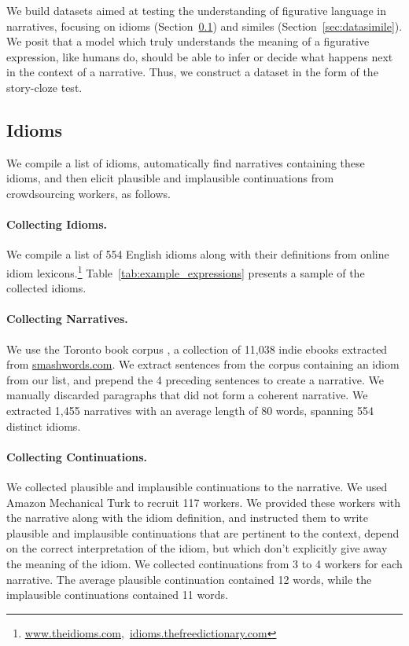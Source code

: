 

We build datasets aimed at testing the understanding of figurative language in narratives, focusing on idioms (Section~\ref{sec:dataidioms}) and similes (Section~\ref{sec:datasimile}). We posit that a model which truly understands the meaning of a figurative expression, like humans do, should be able to infer or decide what happens next in the context of a narrative. Thus, we construct a dataset in the form of the story-cloze test.

\subsection{Idioms}
\label{sec:dataidioms}

We compile a list of idioms, automatically find narratives containing these idioms, and then elicit plausible and implausible continuations from crowdsourcing workers, as follows.

\paragraph{Collecting Idioms.} We compile a list of 554 English idioms along with their definitions from online idiom lexicons.\footnote{\href{http://www.theidioms.com/}{www.theidioms.com},~\href{http://idioms.thefreedictionary.com/}{idioms.thefreedictionary.com}} Table~\ref{tab:example_expressions} presents a sample of the collected idioms.


\paragraph{Collecting Narratives.} We use the Toronto book corpus \cite{zhu2015aligning}, a collection of 11,038 indie ebooks extracted from \url{smashwords.com}. We extract sentences from the corpus containing an idiom from our list, and prepend the 4 preceding sentences to create a narrative. We manually discarded paragraphs that did not form a coherent narrative. We extracted 1,455 narratives with an average length of 80 words, spanning 554 distinct idioms.


\paragraph{Collecting Continuations.} We collected plausible and implausible continuations to the narrative. We used Amazon Mechanical Turk to recruit 117 workers. We provided these workers with the narrative along with the idiom definition, and instructed them to write plausible and implausible continuations that are pertinent to the context, depend on the correct interpretation of the idiom, but which don't explicitly give away the meaning of the idiom. We collected continuations from 3 to 4 workers for each narrative. The average plausible continuation contained 12 words, while the implausible continuations contained 11 words.

